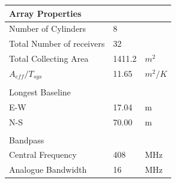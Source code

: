\documentclass[useAMS,macros,usenatbib,onecolumn]{mn2e}
\begin{document}
\begin{figure}
\begin{minipage}[c]{0.475\textwidth}
\begin{tabular}{| l | l | l |}
      \hline
      Array Properties		&            &            	\\
      \hline
      Number of Cylinders 		&          8 &            	\\
      Total Number of receivers 		&         32 &            	\\
      Total Collecting Area 		&     1411.2 &        $m^2$ 	\\
      $A_{eff}/T_{sys}$ 		&      11.65 &      $m^2/K$ 	\\
				      &            &            	\\
      \hline
      Longest Baseline 		&            &            	\\
      \hline
      E-W 				&      17.04 &         m 	\\
      N-S 				&      70.00 &         m 	\\
				      &            &            	\\
      \hline
      Bandpass        		&            &       		\\
      \hline
      Central Frequency 		&        408 &        MHz 	\\
      Analogue Bandwidth 		&         16 &        MHz 	\\

\end{tabular}
\end{minipage}
\end{figure}
\end{document}
